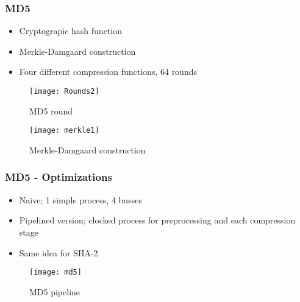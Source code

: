 \begin{frame}
  \frametitle{MD5}
  \begin{minipage}[t]{0.55\linewidth}
    \begin{itemize}
    \item Cryptograpic hash function
    \item Merkle-Damgaard construction
    \item Four different compression functions, 64 rounds
    \end{itemize}
  \end{minipage}\hfill
  \begin{minipage}[t][3cm][c]{0.45\linewidth}
    \centering
    \begin{figure}
      \centering
      \texttt{[image: Rounds2]}
      \caption{MD5 round}
    \end{figure}
  \end{minipage}

  \begin{minipage}[b][3.7cm][b]{0.9\linewidth}
    \begin{figure}
      \centering
      \texttt{[image: merkle1]}
      \caption{Merkle-Damgaard construction}
    \end{figure}
  \end{minipage}
\end{frame}

\begin{frame}
  \frametitle{MD5 - Optimizations}
  \begin{minipage}[t]{\linewidth}
    \begin{itemize}
    \item Naive; 1 simple process, 4 busses
    \item Pipelined version; clocked process for preprocessing and each compression stage
    \item Same idea for SHA-2
    \end{itemize}
  \end{minipage}\hfill
  \begin{minipage}[b]{\linewidth}
    \qquad
    \centering
    \begin{figure}
      \centering
      \texttt{[image: md5]}
      \caption{MD5 pipeline}
    \end{figure}
  \end{minipage}
\end{frame}

